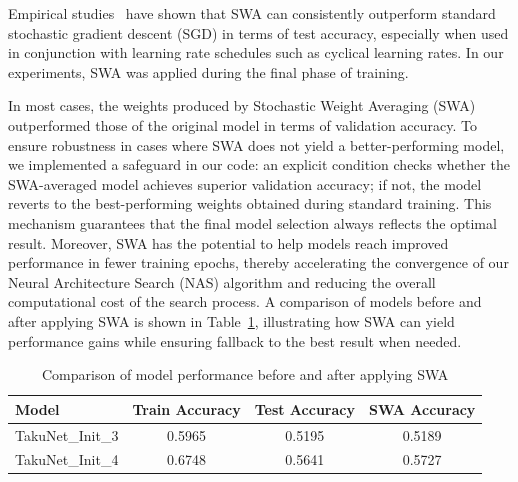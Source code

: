 Empirical studies~\cite{izmailov2018averaging} have shown that SWA can consistently outperform standard stochastic gradient descent (SGD) in terms of test accuracy, especially when used in conjunction with learning rate schedules such as cyclical learning rates. In our experiments, SWA was applied during the final phase of training.

In most cases, the weights produced by Stochastic Weight Averaging (SWA) outperformed those of the original model in terms of validation accuracy. To ensure robustness in cases where SWA does not yield a better-performing model, we implemented a safeguard in our code: an explicit condition checks whether the SWA-averaged model achieves superior validation accuracy; if not, the model reverts to the best-performing weights obtained during standard training. This mechanism guarantees that the final model selection always reflects the optimal result. Moreover, SWA has the potential to help models reach improved performance in fewer training epochs, thereby accelerating the convergence of our Neural Architecture Search (NAS) algorithm and reducing the overall computational cost of the search process. A comparison of models before and after applying SWA is shown in Table~\ref{tab:swa_comparison}, illustrating how SWA can yield performance gains while ensuring fallback to the best result when needed.
\begin{table}[H]
\centering
\begin{tabular}{|l|c|c|c|}
\hline
\textbf{Model} & \textbf{Train Accuracy} & \textbf{Test Accuracy} & \textbf{SWA Accuracy} \\
\hline
TakuNet\_Init\_3  & 0.5965 & 0.5195 & 0.5189 \\
TakuNet\_Init\_4  & 0.6748 & 0.5641 & 0.5727 \\
\hline
\end{tabular}
\caption{Comparison of model performance before and after applying SWA}
\label{tab:swa_comparison}
\end{table}